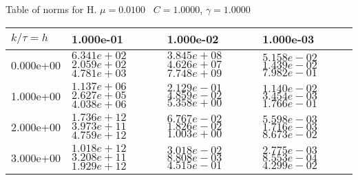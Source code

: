 \begin{center}
Table of norms for H. $\mu = 0.0100$ \, $C = 1.0000$, $\gamma = 1.0000$
  
\begin{tabular}{|p{1in}|p{1in}|p{1in}|p{1in}|} \hline
$k / \tau = h$ &1.000e-01 &1.000e-02 &1.000e-03 \\ \hline 
0.000e+00 & $6.341e+02$  $2.059e+02$  $4.781e+03$  & $3.845e+08$  $4.626e+07$  $7.748e+09$  & $5.158e-02$  $1.439e-02$  $7.982e-01$  \\ \hline 
1.000e+00 & $1.137e+06$  $2.627e+05$  $4.038e+06$  & $2.129e-01$  $4.859e-02$  $5.358e+00$  & $1.140e-02$  $3.454e-03$  $1.766e-01$  \\ \hline 
2.000e+00 & $1.736e+12$  $3.973e+11$  $4.759e+12$  & $6.767e-02$  $1.826e-02$  $1.003e+00$  & $5.598e-03$  $1.716e-03$  $8.673e-02$  \\ \hline 
3.000e+00 & $1.018e+12$  $3.208e+11$  $1.929e+12$  & $3.018e-02$  $8.808e-03$  $4.515e-01$  & $2.775e-03$  $8.553e-04$  $4.299e-02$  \\ \hline 

\end{tabular}\\[20pt]
\end{center}
